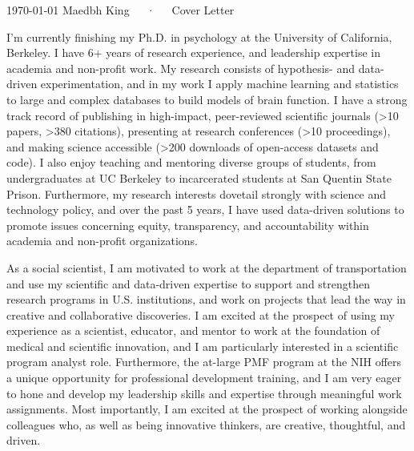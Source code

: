 \documentclass[9pt, a4paper]{maedbh-cv}
\begin{document}
\makecvheader[R]

\makecvfooter
  {\today}
  {Maedbh King~~~·~~~Cover Letter}
  {}
  
\makelettertitle

\begin{cvletter}

I'm currently finishing my Ph.D. in psychology at the University of California, Berkeley. I have 6+ years of research experience, and leadership expertise in academia and non-profit work. My research consists of hypothesis- and data-driven experimentation, and in my work I apply machine learning and statistics to large and complex databases to build models of brain function. I have a strong track record of publishing in high-impact, peer-reviewed scientific journals (>10 papers, >380 citations), presenting at research conferences (>10 proceedings), and making science accessible (>200 downloads of open-access datasets and code). I also enjoy teaching and mentoring diverse groups of students, from undergraduates at UC Berkeley to incarcerated students at San Quentin State Prison. Furthermore, my research interests dovetail strongly with science and technology policy, and over the past 5 years, I have used data-driven solutions to promote issues concerning equity, transparency, and accountability within academia and non-profit organizations. 

As a social scientist, I am motivated to work at the department of transportation and use my scientific and data-driven expertise to support and strengthen research programs in U.S. institutions, and work on projects that lead the way in creative and collaborative discoveries. I am excited at the prospect of using my experience as a scientist, educator, and mentor to work at the foundation of medical and scientific innovation, and I am particularly interested in a scientific program analyst role. Furthermore, the at-large PMF program at the NIH offers a unique opportunity for professional development training, and I am very eager to hone and develop my leadership skills and expertise through meaningful work assignments. Most importantly, I am excited at the prospect of working alongside colleagues who, as well as being innovative thinkers, are creative, thoughtful, and driven. 


\end{cvletter}
\end{document}

